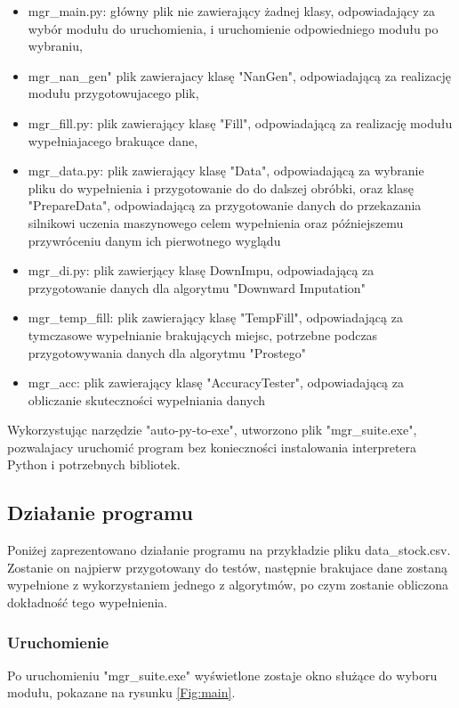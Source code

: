 \documentclass[12pt,twoside]{article}
\begin{document}
\begin{itemize}[label=-,labelsep=0.4cm, leftmargin=1.25cm]
    \item mgr\_main.py: główny plik nie zawierający żadnej klasy, odpowiadający za wybór modułu do uruchomienia,
    i uruchomienie odpowiedniego modułu po wybraniu,
    \item mgr\_nan\_gen" plik zawierajacy klasę "NanGen", odpowiadającą za realizację modułu przygotowujacego plik,
    \item mgr\_fill.py: plik zawierający klasę "Fill", odpowiadającą za realizację modułu wypełniajacego brakuące dane,
    \item mgr\_data.py: plik zawierający klasę "Data",
    odpowiadającą za wybranie pliku do wypełnienia i przygotowanie do do dalszej obróbki, oraz klasę "PrepareData",
    odpowiadającą za przygotowanie danych do przekazania silnikowi uczenia maszynowego celem wypełnienia
    oraz późniejszemu przywróceniu danym ich pierwotnego wyglądu
    \item mgr\_di.py: plik zawierjący klasę DownImpu,
    odpowiadającą za przygotowanie danych dla algorytmu "Downward Imputation"
    \item mgr\_temp\_fill: plik zawierający klasę "TempFill", odpowiadającą za tymczasowe wypełnianie brakujących miejsc,
    potrzebne podczas przygotowywania danych dla algorytmu "Prostego"
    \item mgr\_acc: plik zawierający klasę "AccuracyTester", odpowiadającą za obliczanie skuteczności wypełniania danych
\end{itemize}

Wykorzystując narzędzie "auto-py-to-exe", utworzono plik "mgr\_suite.exe",
pozwalajacy uruchomić program bez konieczności instalowania interpretera Python i potrzebnych bibliotek.

\subsection{Działanie programu}
Poniżej zaprezentowano działanie programu na przykładzie pliku data\_stock.csv.
Zostanie on najpierw przygotowany do testów,
następnie brakujace dane zostaną wypełnione z wykorzystaniem jednego z algorytmów,
po czym zostanie obliczona dokładność tego wypełnienia.
\subsubsection{Uruchomienie}
Po uruchomieniu "mgr\_suite.exe" wyświetlone zostaje okno służące do wyboru modułu, pokazane na rysunku \ref{Fig:main}.
\end{document}
